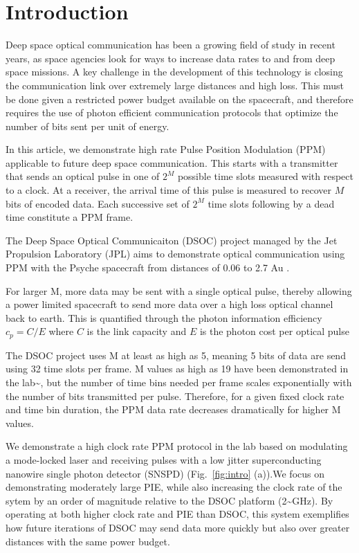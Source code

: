 \documentclass[11pt]{caltech_thesis} %
\begin{document}
\hypertarget{introduction-2}{%
\section{Introduction}\label{introduction-2}}

Deep space optical communication has been a growing field of study in
recent years, as space agencies look for ways to increase data rates to
and from deep space missions. A key challenge in the development of this
technology is closing the communication link over extremely large
distances and high loss. This must be done given a restricted power
budget available on the spacecraft, and therefore requires the use of
photon efficient communication protocols that optimize the number of
bits sent per unit of energy.

In this article, we demonstrate high rate Pulse Position Modulation
(PPM) applicable to future deep space communication. This starts with a
transmitter that sends an optical pulse in one of $2^M$ possible time
slots measured with respect to a clock. At a receiver, the arrival time
of this pulse is measured to recover $M$ bits of encoded data. Each
successive set of $2^M$ time slots following by a dead time constitute a
PPM frame.

The Deep Space Optical Communicaiton (DSOC) project managed by the Jet
Propulsion Laboratory (JPL) aims to demonstrate optical communication
using PPM with the Psyche spacecraft from distances of 0.06 to 2.7 Au
\autocite{Srinivasan2023GroundReceiver}.

For larger M, more data may be sent with a single optical pulse, thereby
allowing a power limited spacecraft to send more data over a high loss
optical channel back to earth. This is quantified through the photon
information efficiency $c_p = C/E$ where $C$ is the link capacity and
$E$ is the photon cost per optical pulse

The DSOC project uses M at least as high as 5, meaning 5 bits of data
are send using 32 time slots per frame. M values as high as 19 have been
demonstrated in the lab\textasciitilde{}\autocite{essiambre2023record},
but the number of time bins needed per frame scales exponentially with
the number of bits transmitted per pulse. Therefore, for a given fixed
clock rate and time bin duration, the PPM data rate decreases
dramatically for higher M values.

We demonstrate a high clock rate PPM protocol in the lab based on
modulating a mode-locked laser and receiving pulses with a low jitter
superconducting nanowire single photon detector (SNSPD)
(Fig.~\ref{fig:intro} (a)).We focus on demonstrating moderately large
PIE, while also increasing the clock rate of the sytem by an order of
magnitude relative to the DSOC platform (2\textasciitilde GHz). By
operating at both higher clock rate and PIE than DSOC, this system
exemplifies how future iterations of DSOC may send data more quickly but
also over greater distances with the same power budget.
\end{document}
